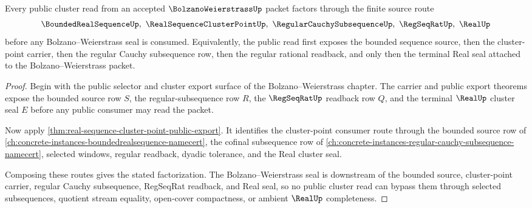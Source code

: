 \begin{theorem}
\label{thm:bolzano-weierstrass-cluster-source-factorization}
Every public cluster read from an accepted $\BolzanoWeierstrassUp$ packet factors through the finite source route
$$
\BoundedRealSequenceUp,\ \RealSequenceClusterPointUp,\ \RegularCauchySubsequenceUp,\ \RegSeqRatUp,\ \RealUp
$$
before any Bolzano--Weierstrass seal is consumed. Equivalently, the public read first exposes the bounded sequence source, then the cluster-point carrier, then the regular Cauchy subsequence row, then the regular rational readback, and only then the terminal Real seal attached to the Bolzano--Weierstrass packet.
\end{theorem}
\begin{proof}
Begin with the public selector and cluster export surface of the Bolzano--Weierstrass chapter. The carrier and public export theorems expose the bounded source row $S$, the regular-subsequence row $R$, the $\RegSeqRatUp$ readback row $Q$, and the terminal $\RealUp$ cluster seal $E$ before any public consumer may read the packet.

Now apply \autoref{thm:real-sequence-cluster-point-public-export}. It identifies the cluster-point consumer route through the bounded source row of \autoref{ch:concrete-instances-boundedrealsequence-namecert}, the cofinal subsequence row of \autoref{ch:concrete-instances-regular-cauchy-subsequence-namecert}, selected windows, regular readback, dyadic tolerance, and the Real cluster seal.

Composing these routes gives the stated factorization. The Bolzano--Weierstrass seal is downstream of the bounded source, cluster-point carrier, regular Cauchy subsequence, RegSeqRat readback, and Real seal, so no public cluster read can bypass them through selected subsequences, quotient stream equality, open-cover compactness, or ambient $\RealUp$ completeness.
\end{proof}

